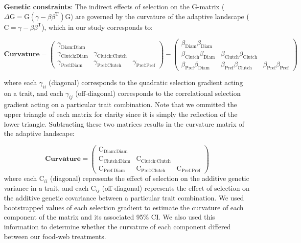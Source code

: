 \documentclass[11pt,]{article}
\begin{document}
\textbf{Genetic constraints}: The indirect effects of selection on the
G-matrix
(\(\Delta\text{G}=\text{G}(\gamma - \beta \beta^\text{T})\text{G}\)) are
governed by the curvature of the adaptive landscape
(\(\text{C}=\gamma - \beta \beta^\text{T}\)), which in our study
corresponds to:

\[\textbf{Curvature} = \begin{pmatrix} \gamma_{\text{Diam:Diam}}&& \\ \gamma_{\text{Clutch:Diam}}&\gamma_{\text{Clutch:Clutch}}& \\ \gamma_{\text{Pref:Diam}} & \gamma_{\text{Pref:Clutch}} &\gamma_{\text{Pref:Pref}} \end{pmatrix} - \begin{pmatrix} \beta_{\text{Diam}}\beta_{\text{Diam}}&& \\ \beta_{\text{Clutch}}\beta_{\text{Diam}}&\beta_{\text{Clutch}}\beta_{\text{Clutch}}& \\ \beta_{\text{Pref}}\beta_{\text{Diam}} & \beta_{\text{Pref}}\beta_{\text{Clutch}} &\beta_{\text{Pref}}\beta_{\text{Pref}} \end{pmatrix}\]

where each \(\gamma_{ii}\) (diagonal) corresponds to the quadratic
selection gradient acting on a trait, and each \(\gamma_{ij}\)
(off-diagonal) corresponds to the correlational selection gradient
acting on a particular trait combination. Note that we ommitted the
upper triangle of each matrix for clarity since it is simply the
reflection of the lower triangle. Subtracting these two matrices results
in the curvature matrix of the adaptive landscape:

\[\textbf{Curvature} = \begin{pmatrix} \text{C}_{\text{Diam:Diam}}&& \\ \text{C}_{\text{Clutch:Diam}} & \text{C}_{\text{Clutch:Clutch}} & \\ \text{C}_{\text{Pref:Diam}} & \text{C}_{\text{Pref:Clutch}} & \text{C}_{\text{Pref:Pref}} \end{pmatrix}\]
where each \(\text{C}_{ii}\) (diagonal) represents the effect of
selection on the additive genetic variance in a trait, and each
\(\text{C}_{ij}\) (off-diagonal) represents the effect of selection on
the additive genetic covariance between a particular trait combination.
We used bootstrapped values of each selection gradient to estimate the
curvature of each component of the matrix and its associated 95\% CI. We
also used this information to determine whether the curvature of each
component differed between our food-web treatments.
\end{document}
